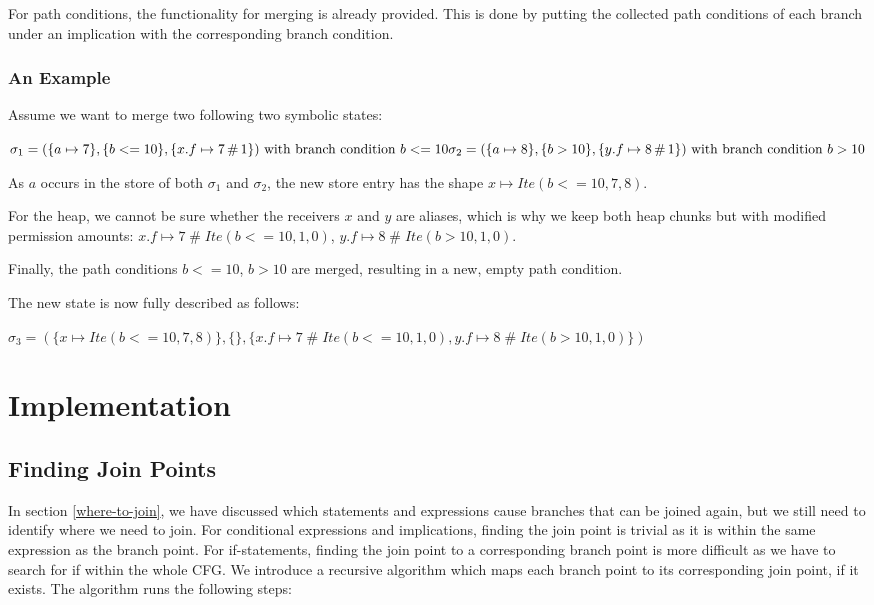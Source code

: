 \documentclass[11pt]{article}
\DeclareMathOperator{\perm}{\mathbin{\#}}
\begin{document}
    For path conditions, the functionality for merging is already provided.
    This is done by putting the collected path conditions of each branch
    under an implication with the corresponding branch condition.


    \subsubsection{An Example}

    Assume we want to merge two following two symbolic states:
    
    \begin{math}
        \sigma_1 = (\{a \mapsto 7\}, \{b <= 10\}, \{x.f \mapsto 7 \perm 1\}) \text{ with branch condition } b <= 10 \\
        \sigma_2 = (\{a \mapsto 8\}, \{b > 10\}, \{y.f \mapsto 8 \perm 1\}) \text{ with branch condition } b > 10
    \end{math}

    As $a$ occurs in the store of both $\sigma_1$ and $\sigma_2$,
    the new store entry has the shape $x \mapsto Ite(b <= 10, 7, 8)$.

    For the heap, we cannot be sure whether the receivers $x$ and $y$
    are aliases, which is why we keep both heap chunks but with modified
    permission amounts: $x.f \mapsto 7 \perm Ite(b <= 10, 1, 0)$, $y.f \mapsto 8 \perm Ite(b > 10, 1, 0)$.

    Finally, the path conditions $b <= 10$, $b > 10$ are merged, resulting
    in a new, empty path condition.

    The new state is now fully described as follows: 

    \begin{math}
        \sigma_3 = (\{x \mapsto Ite(b <= 10, 7, 8)\}, \{\}, \{x.f \mapsto 7 \perm Ite(b <= 10, 1, 0), y.f \mapsto 8 \perm Ite(b > 10, 1, 0)\})
    \end{math}

    \newpage
    \section{Implementation}

    \subsection{Finding Join Points} \label{finding-join-points}

    In section \ref{where-to-join}, we have discussed which statements and expressions cause
    branches that can be joined again, but we still need to identify where we need to join.
    For conditional expressions and implications, finding the join point is trivial
    as it is within the same expression as the branch point.
    For if-statements, finding the join point to a corresponding branch point is more 
    difficult as we have to search
    for if within the whole CFG.
    We introduce a recursive algorithm which maps each branch point to its corresponding join point,
    if it exists. The algorithm runs the following steps:
\end{document}
